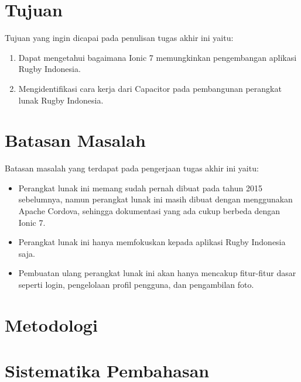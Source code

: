 
\section{Tujuan}
\label{sec:tujuan}
Tujuan yang ingin dicapai pada penulisan tugas akhir ini yaitu:
\begin{enumerate}
    \item Dapat mengetahui bagaimana Ionic 7 memungkinkan pengembangan aplikasi Rugby Indonesia.
    \item Mengidentifikasi cara kerja dari Capacitor pada pembangunan perangkat lunak Rugby Indonesia.
\end{enumerate}


\section{Batasan Masalah}
\label{sec:batasan}
Batasan masalah yang terdapat pada pengerjaan tugas akhir ini yaitu:
\begin{itemize}
    \item Perangkat lunak ini memang sudah pernah dibuat pada tahun 2015 sebelumnya, namun perangkat lunak ini masih dibuat dengan menggunakan Apache Cordova, sehingga dokumentasi yang ada cukup berbeda dengan Ionic 7.
    \item Perangkat lunak ini hanya memfokuskan kepada aplikasi Rugby Indonesia saja.
    \item Pembuatan ulang perangkat lunak ini akan hanya mencakup fitur-fitur dasar seperti login, pengelolaan profil pengguna, dan pengambilan foto.
\end{itemize}


\section{Metodologi}
\label{sec:metlit}


\section{Sistematika Pembahasan}
\label{sec:sispem}

